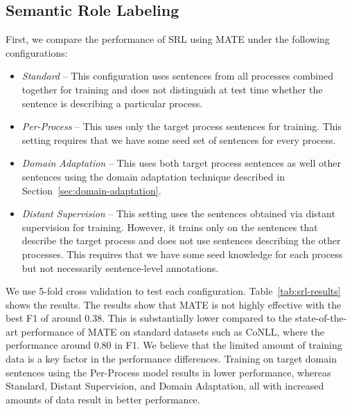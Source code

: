 \subsection{Semantic Role Labeling}

First, we compare the performance of SRL using MATE under the following configurations:
\begin{itemize}[noitemsep,nolistsep]
\item {\em Standard} -- This configuration uses sentences from all processes combined together for training and does not distinguish at test time whether the sentence is describing a particular process.
\item {\em Per-Process} -- This uses only the target process sentences for training. This setting requires that we have some seed set of sentences for every process.
\item {\em Domain Adaptation} -- This uses both target process sentences as well other sentences using the domain adaptation technique described in Section~\ref{sec:domain-adaptation}.
\item {\em Distant Supervision} -- This setting uses the sentences obtained via distant supervision for training. 
However, it trains only on the sentences that describe the target process and does not use sentences describing the other processes. 
This requires that we have some seed knowledge for each process but not necessarily sentence-level annotations.
\end{itemize}

We use 5-fold cross validation to test each configuration.
Table~\ref{tab:srl-results} shows the results. 
The results show that MATE is not highly effective with the best F1 of around 0.38. 
This is substantially lower compared to the state-of-the-art performance of MATE on standard datasets such as CoNLL, where the performance around 0.80 in F1. 
We believe that the limited amount of training data is a key factor in the performance differences.
Training on target domain sentences using the Per-Process model results in lower performance, whereas Standard, Distant Supervision, and Domain Adaptation, all with increased amounts of data result in better performance. 


